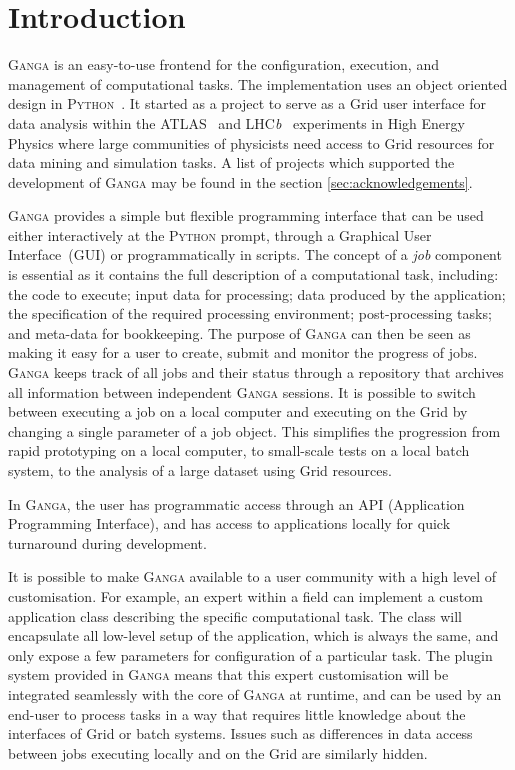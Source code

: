 \documentclass{elsart}
\def\lhcb {LHC{\em b\/}\xspace}
\def\atlas {ATLAS\xspace}
\def\ganga {\textsc{Ganga}\xspace}
\def\python {\textsc{Python}\xspace}
\def\grid {Grid\xspace}
\begin{document}

\section{Introduction}
\label{sec:intro}
\ganga is an easy-to-use frontend for the configuration, execution, and
management of computational tasks. The implementation uses an object oriented
design in \python~\cite{python}. It started as a project
to serve as a \grid user interface for data
analysis within the \atlas~\cite{ATLAS} and
\lhcb~\cite{LHCb} experiments in High Energy Physics where large
communities of physicists need access to \grid resources for data mining
and simulation tasks. A list of projects which supported the development of \ganga
may be found in the section \ref{sec:acknowledgements}.

\ganga provides a simple but flexible programming interface that can
be used either interactively at the \python prompt, through a
Graphical User Interface~(GUI) or programmatically in scripts. The
concept of a \emph{job} component is essential as it contains the full
description of a computational task, including: the code to execute;
input data for processing; data produced by the application; the
specification of the required processing environment; post-processing
tasks; and meta-data for bookkeeping.  The purpose of \ganga can then
be seen as making it easy for a user to create, submit and monitor the
progress of jobs. \ganga keeps track of all jobs and their status
through a repository that archives all information between independent
\ganga sessions. It is possible to switch between executing a job on a
local computer and executing on the \grid by changing a single parameter of a job object. 
This simplifies the progression from rapid prototyping on a local
computer, to small-scale tests on a local batch system, to the analysis of a
large dataset using \grid resources.

In \ganga, the user has programmatic access through an API (Application
Programming Interface), and has access to applications locally for
quick turnaround during development. 

It is possible to make \ganga available to a user community with a high level
of customisation. For example, an expert within a field can implement a custom
application class describing the specific computational task. The class will
encapsulate all low-level setup of the application, which is always
the same, and only expose a few parameters for configuration of a particular
task. The plugin system provided in \ganga means that this expert
customisation will be integrated seamlessly with the core of \ganga at runtime,
and can be used by an end-user to process tasks in a way that requires
little knowledge about the interfaces of \grid or batch systems. Issues such as
differences in data access between jobs executing locally and on the
\grid are similarly hidden.
\end{document}
